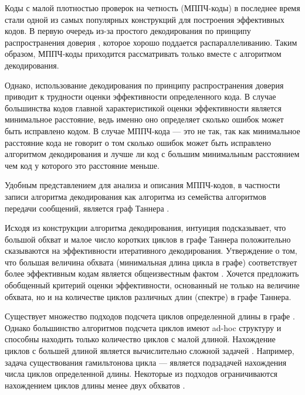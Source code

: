 \startprefacepage

Коды с малой плотностью проверок на четность (МППЧ-коды) в последнее время стали одной из
самых популярных конструкций для построения эффективных кодов. В первую очередь из-за 
простого декодирования по принципу распространения доверия \cite{understanding-belief-propogation}, которое
хорошо поддается распараллеливанию. Таким образом, МППЧ-коды приходится рассматривать только вместе с
алгоритмом декодирования.

Однако, использование декодирования по принципу распространения доверия приводит к трудности оценки
эффективности определенного кода. В случае большинства кодов главной характеристикой оценки эффективности
является минимальное расстояние, ведь именно оно определяет сколько ошибок может быть исправлено кодом.
В случае МППЧ-кода --- это не так, так как минимальное расстояние кода не говорит о том сколько ошибок может быть исправлено алгоритмом декодирования и лучше ли код с большим минимальным расстоянием
чем код у которого это расстояние меньше.

Удобным представлением для анализа и описания МППЧ-кодов, в частности записи алгоритма декодирования
как алгоритма из семейства алгоритмов передачи сообщений, является граф Таннера \cite{kudryashov-codingtheory}.

Исходя из конструкции алгоритма декодирования, интуиция подсказывает, что большой обхват и 
малое число коротких циклов в графе Таннера положительно сказываются на эффективности 
итеративного декодирования. Утверждение о том, что большая величина обхвата 
(минимальная длина цикла в графе) соответствует более эффективным кодам является общеизвестным фактом \cite{kudryashov-codingtheory}. Хочется предложить обобщенный критерий оценки
эффективности, основанный не только на величине обхвата, но и на количестве циклов различных длин (спектре)
в графе Таннера.

Существует множество подходов подсчета циклов определенной длины в графе
\cite{finding-and-counting-given-length-cycles,on-the-number-of-cycles-in-a-graph}.
Однако большинство алгоритмов подсчета циклов имеют ad-hoc структуру и способны находить 
только количество циклов
с малой длиной. Нахождение циклов с большей длиной является вычислительно сложной задачей
\cite{how-to-find-long-paths-efficiently,color-coding}. 
Например, задача существования гамильтонова цикла --- является подзадачей нахождения числа циклов
определенной длины. Некоторые из подходов ограничиваются нахождением циклов длины менее двух обхватов 
\cite{message-passing-algorithm-for-counting-short-cycles-in-graph,counting-short-cycles-of-quasi-cyclic-protograph-ldpc-codes}.

